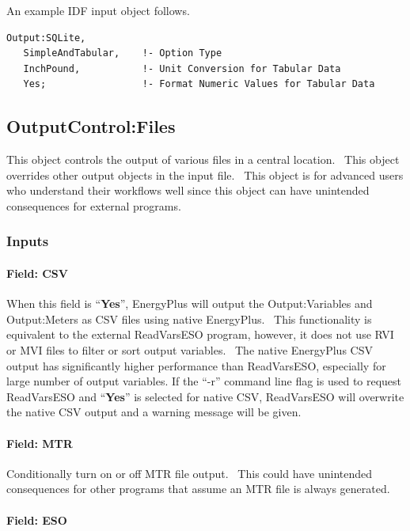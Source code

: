 An example IDF input object follows.
\begin{lstlisting}
Output:SQLite,
   SimpleAndTabular,    !- Option Type
   InchPound,           !- Unit Conversion for Tabular Data
   Yes;                 !- Format Numeric Values for Tabular Data      
\end{lstlisting}

\subsection{OutputControl:Files}\label{outputcontrolfiles}

This object controls the output of various files in a central location.~ This object overrides other output objects in the input file.~ This object is for advanced users who understand their workflows well since this object can have unintended consequences for external programs.

\subsubsection{Inputs}\label{outputcontrolfiles-inputs}

\paragraph{Field: CSV}\label{field-csv}

When this field is ``\textbf{Yes}'', EnergyPlus will output the Output:Variables and Output:Meters as CSV files using native EnergyPlus.~ This functionality is equivalent to the external ReadVarsESO program, however, it does not use RVI or MVI files to filter or sort output variables.~ The native EnergyPlus CSV output has significantly higher performance than ReadVarsESO, especially for large number of output variables. If the ``-r'' command line flag is used to request ReadVarsESO and ``\textbf{Yes}'' is selected for native CSV, ReadVarsESO will overwrite the native CSV output and a warning message will be given.

\paragraph{Field: MTR}\label{field-mtr}

Conditionally turn on or off MTR file output.~ This could have unintended consequences for other programs that assume an MTR file is always generated.

\paragraph{Field: ESO}\label{field-eso}

